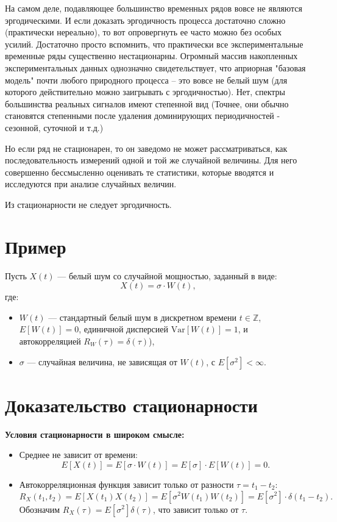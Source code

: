 На самом деле, подавляющее большинство временных рядов вовсе
не являются эргодическими. И если доказать эргодичность процесса
достаточно сложно (практически нереально), то вот
опровергнуть ее часто можно без особых усилий. Достаточно просто
вспомнить, что практически все экспериментальные временные ряды
существенно нестационарны. Огромный массив накопленных
экспериментальных данных однозначно свидетельствует, что априорная
"базовая модель" почти любого природного процесса – это вовсе не
белый шум (для которого действительно можно заигрывать с
эргодичностью). Нет, спектры большинства реальных сигналов имеют
степенной вид (Точнее, они обычно становятся степенными после
удаления доминирующих периодичностей - сезонной, суточной и т.д.)

Но если ряд не стационарен, то он заведомо не может
рассматриваться, как последовательность измерений одной и той же
случайной величины. Для него совершенно бессмысленно оценивать те
статистики, которые вводятся и исследуются при анализе случайных величин.

Из стационарности не следует эргодичность.

\section*{Пример}

Пусть \( X(t) \) — белый шум со случайной мощностью, заданный в виде:
\[
  X(t) = \sigma \cdot W(t),
\]
где:
\begin{itemize}
  \item \( W(t) \) — стандартный белый шум в дискретном времени \(t
    \in \mathbb{Z}\), \(
    E[W(t)] = 0 \), единичной дисперсией \( \text{Var}[W(t)] = 1 \),
  и автокорреляцией \( R_W(\tau) = \delta(\tau) \)),
\item \( \sigma \) — случайная величина, не зависящая от \( W(t)
  \), с \( E[\sigma^2] < \infty \).
\end{itemize}

\section*{Доказательство стационарности}
\textbf{Условия стационарности в широком смысле:}
\begin{itemize}
\item Среднее не зависит от времени:
  \[
    E[X(t)] = E[\sigma \cdot W(t)] = E[\sigma] \cdot E[W(t)] = 0.
  \]

\item Автокорреляционная функция зависит только от разности \( \tau
  = t_1 - t_2 \):
  \[
    R_X(t_1, t_2) = E[X(t_1)X(t_2)] = E[\sigma^2 W(t_1) W(t_2)] =
    E[\sigma^2] \cdot \delta(t_1 - t_2).
  \]
  Обозначим \( R_X(\tau) = E[\sigma^2] \delta(\tau) \), что зависит
  только от \( \tau \).
\end{itemize}

